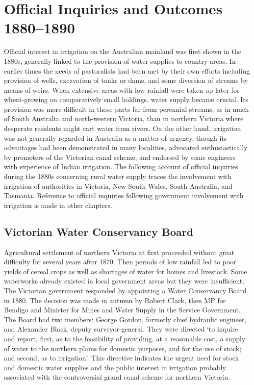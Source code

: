 
\setcounter{endnote}{0}

\chapter{Official Inquiries and Outcomes 1880--1890}

Official interest in irrigation on the Australian mainland was first
shown in the 1880s, generally linked to the provision of water
supplies to country areas.  In earlier times the needs of pastoralists
had been met by their own efforts including provision of wells,
excavation of tanks or dams, and some diversion of streams by means of
weirs.  When extensive areas with low rainfall were taken up later for
wheat-growing on comparatively small holdings, water supply became
crucial.  Its provision was more difficult in those parts far from
perennial streams, as in much of South Australia and north-western
Victoria, than in northern Victoria where desperate residents might
cart water from rivers.  On the other hand, irrigation was not
generally regarded in Australia as a matter of urgency, though its
advantages had been demonstrated in many localities, advocated
enthusiastically by promoters of the Victorian canal scheme, and
endorsed by some engineers with experience of Indian irrigation.  The
following account of official inquiries during the 1880s concerning
rural water supply traces the involvement with irrigation of
authorities in Victoria, New South Wales, South Australia, and
Tasmania.  Reference to official inquiries following government
involvement with irrigation is made in other chapters.

\section*{Victorian Water Conservancy Board}

Agricultural settlement of northern Victoria at first proceeded
without great difficulty for several years after 1870.  Then periods
of low rainfall led to poor yields of cereal crops as well as
shortages of water for homes and livestock.  Some waterworks already
existed in local government areas but they were insufficient.  The
Victorian government responded by appointing a Water Conservancy Board
in 1880.  The decision was made in autumn by Robert Clark, then MP for
Bendigo and Minister for Mines and Water Supply in the Service
Government.  The Board had two members: George Gordon, formerly chief
hydraulic engineer, and Alexander Black, deputy surveyor-general.
They were directed `to inquire and report, first, as to the
feasibility of providing, at a reasonable cost, a supply of water to
the northern plains for domestic purposes, and for the use of stock;
and second, as to irrigation'.
This directive indicates the urgent need for stock and domestic water
supplies and the public interest in irrigation probably associated
with the controversial grand canal scheme for northern Victoria.

